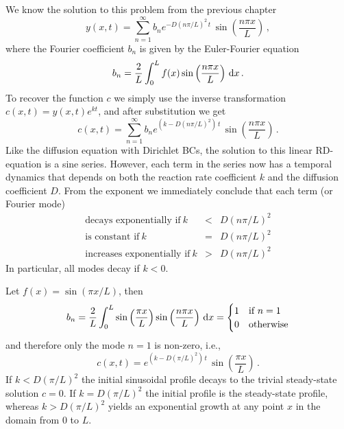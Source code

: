 We know the solution to this problem from the previous chapter 
\begin{equation}
  y(x,t) = \sum_{n=1}^\infty b_n e^{-D\left(n\pi/L\right)^2 \, t} \,
	\sin\left(\frac{n\pi x}{L} \right) \, ,
\end{equation}
where the Fourier coefficient $b_n$ is given by the Euler-Fourier equation
\begin{equation}
	b_n = \frac{2}{L} \int_0^L f(x)    \sin\left(\frac{n\pi x}{L} \right) \, \mathrm{d} x \, .
\end{equation}
To recover the function $c$ we simply use the inverse transformation $c(x,t)=y(x,t)e^{k t}$, 
and after substitution we get
\begin{equation}
  c(x,t) = \sum_{n=1}^\infty b_n e^{\left(k -D\left(n\pi/L\right)^2 \right)\, t} \,
	\sin\left(\frac{n\pi x}{L} \right) \, .
\end{equation}
Like the diffusion equation with Dirichlet BCs, the solution to this linear RD-equation is
a sine series. However, each term in the series now has a temporal dynamics that 
depends on both the reaction rate coefficient $k$  and the diffusion coefficient $D$. 
From the exponent we immediately conclude that each term (or Fourier mode)
\begin{eqnarray}
  \label{eq:linstablcriterion}
  \text{decays exponentially if} \ k &<& D\left(n\pi/L\right)^2 \nonumber \\
  \text{is constant if} \ k &=& D\left(n\pi/L\right)^2  \\
  \text{increases exponentially if} \ k &>& D\left(n\pi/L\right)^2 \nonumber
\end{eqnarray}
In particular, all modes decay if $k<0$. 

\begin{example} \label{example:linearonemode}
  Let $f(x) = \sin(\pi x/L)$, then
  \begin{equation}
	  b_n = \frac{2}{L} \int_0^L \sin\left(\frac{\pi x}{L}\right)  \sin\left(\frac{n\pi x}{L}
	  \right) \, \mathrm{d} x = 
    \begin{cases}
      1 & \text{if } n=1 \\
      0 & \text{otherwise}
    \end{cases}
  \end{equation}
  and therefore only the mode $n=1$ is non-zero, i.e., 
  \begin{equation}
    c(x,t)= e^{\left(k -D\left(\pi/L\right)^2 \right)\, t} \,
	  \sin\left(\frac{\pi x}{L} \right) \, .
  \end{equation}
  If $k< D\left(\pi/L\right)^2$ the initial sinusoidal profile decays to the
  trivial steady-state solution $c=0$. If $k = D\left(\pi/L\right)^2$ the initial
  profile is the steady-state profile, whereas $k>D\left(\pi/L\right)^2$ yields
  an exponential growth at any point $x$ in the domain from 0 to $L$.
\end{example}

